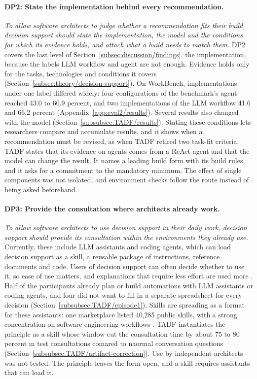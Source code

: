 \paragraph{DP2: State the implementation behind every recommendation.}
\emph{To allow software architects to judge whether a recommendation fits their build, decision support should state the implementation, the model and the conditions for which its evidence holds, and attach what a build needs to match them.} DP2 covers the last level of Section~\ref{subsec:discussion/findings}, the implementation, because the labels LLM workflow and agent are not enough. Evidence holds only for the tasks, technologies and conditions it covers (Section~\ref{subsec:theory/decision-support}). On WorkBench, implementations under one label differed widely: four configurations of the benchmark's agent reached 43.0 to 60.9 percent, and two implementations of the LLM workflow 41.6 and 66.2 percent (Appendix~\ref{app:eval2/results}). Several results also changed with the model (Section~\ref{subsubsec:TADF/results}). Stating these conditions lets researchers compare and accumulate results, and it shows when a recommendation must be revised, as when TADF retired two task-fit criteria. TADF states that its evidence on agents comes from a ReAct agent and that the model can change the result. It names a leading build form with its build rules, and it asks for a commitment to the mandatory minimum. The effect of single components was not isolated, and environment checks follow the route instead of being asked beforehand.

\paragraph{DP3: Provide the consultation where architects already work.}
\emph{To allow software architects to use decision support in their daily work, decision support should provide its consultation within the environments they already use.} Currently, these include LLM assistants and coding agents, which can load decision support as a skill, a reusable package of instructions, reference documents and code. Users of decision support can often decide whether to use it, so ease of use matters, and explanations that require less effort are used more \parencite{spragueFrameworkDevelopmentDecision1980,gregorExplanationsIntelligentSystems1999}. Half of the participants already plan or build automations with LLM assistants or coding agents, and four did not want to fill in a separate spreadsheet for every decision (Section~\ref{subsubsec:TADF/episode1}). Skills are spreading as a format for these assistants: one marketplace listed 40,285 public skills, with a strong concentration on software engineering workflows \parencite{lingAgentSkillsDataDriven2026}. TADF instantiates the principle as a skill whose window cut the consultation time by about 75 to 80 percent in test consultations comared to naormal conversation questions (Section~\ref{subsubsec:TADF/artifact-correction}). Use by independent architects was not tested. The principle leaves the form open, and a skill requires assistants that can load it.

